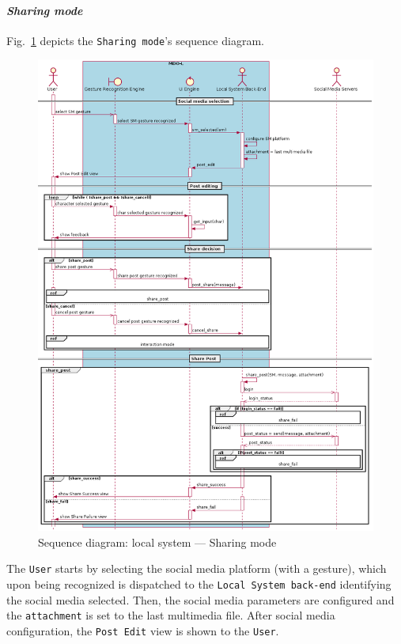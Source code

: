 \paragraph{\emph{Sharing mode}}
Fig.~\ref{fig:seq-local-sharing-mode} depicts the \texttt{Sharing
  mode}'s sequence diagram.
%
\begin{figure}[htb!]
  \centering
  \includegraphics[width=0.9\columnwidth]{./img/seq-local-sharing-mode.png}
  \caption{Sequence diagram: local system --- Sharing mode}%
\label{fig:seq-local-sharing-mode}
\end{figure}

The \texttt{User} starts by selecting the social media platform (with a
gesture), which upon being recognized is dispatched to the \texttt{Local System
  back-end} identifying the social media selected. Then, the social media
parameters are configured and the \texttt{attachment} is set to the last
multimedia file. After social media configuration, the \texttt{Post Edit} view
is shown to the \texttt{User}.

